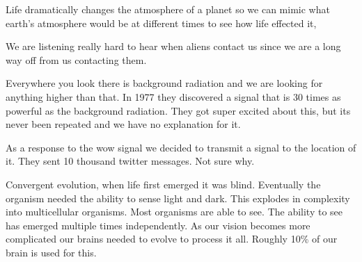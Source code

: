 \documentclass{article}
\begin{document}

Life dramatically changes the atmosphere of a planet so we can mimic what earth's atmosphere would be at different times to see how life effected it,




We are listening really hard to hear when aliens contact us since we are a long way off from us contacting them.


Everywhere you look there is background radiation and we are looking for anything higher than that. In 1977 they discovered a signal that is 30 times as powerful as the background radiation. They got super excited about this, but its never been repeated and we have no explanation for it.


As a response to the wow signal we decided to transmit a signal to the location of it. They sent 10 thousand twitter messages. Not sure why.


Convergent evolution, when life first emerged it was blind. Eventually the organism needed the ability to sense light and dark. This explodes in complexity into multicellular organisms. Most organisms are able to see. The ability to see has emerged multiple times independently. As our vision becomes more complicated our brains needed to evolve to process it all. Roughly 10\% of our brain is used for this.


\end{document}
